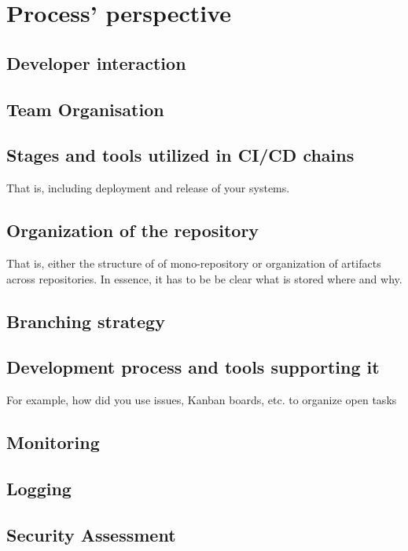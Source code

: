 \documentclass{article}
\begin{document}
\section{Process' perspective}

\subsection{Developer interaction}

\subsection{Team Organisation}


\subsection{Stages and tools utilized in CI/CD chains}
That is, including deployment and release of your systems.

\subsection{Organization of the repository}

That is, either the structure of of mono-repository or organization of artifacts across repositories.
In essence, it has to be be clear what is stored where and why.

\subsection{Branching strategy}

\subsection{Development process and tools supporting it}

For example, how did you use issues, Kanban boards, etc. to organize open tasks

\subsection{Monitoring}



\subsection{Logging}

\subsection{Security Assessment}
\end{document}
